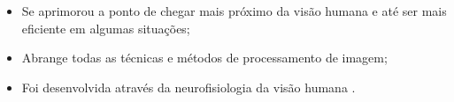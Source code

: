 \begin{itemize}

\item Se aprimorou a ponto de chegar mais próximo da visão humana e até ser mais eficiente em algumas situações;

\item Abrange todas as técnicas e métodos de processamento de imagem;

\item Foi desenvolvida através da neurofisiologia da visão humana \cite{MARR76}.

\end{itemize}